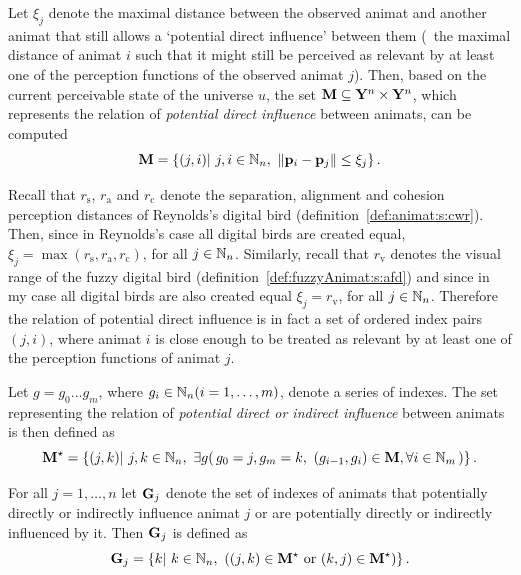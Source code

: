Let $\xi_j$ denote the maximal distance between the observed animat and another animat that still allows a `potential direct influence' between them (\ie\ the maximal distance of animat $i$ such that it might still be perceived as relevant by at least one of the perception functions of the observed animat $j$). Then, based on the current perceivable state of the universe $u$, the set ${\mathbf{M}} \subseteq {\ensuremath{\mathbf{Y}}}^n \times {\ensuremath{\mathbf{Y}}}^n$, which represents the relation of \emph{potential direct influence} between animats, can be computed
%
\begin{equation}
\set{M}=\left\{ (j,i)|\ j, i \in \N_n,\ \left\|\vect{p}_i-\vect{p}_j\right\| \leq \xi_j \right\}. \label{eq:metric:M}
\end{equation}

Recall that $r_\mathrm{s}$, $r_\mathrm{a}$ and $r_\mathrm{c}$ denote the separation, alignment and cohesion perception distances of Reynolds's digital bird (definition~\ref{def:animat:s:cwr}). Then, since in Reynolds's case all digital birds are created equal, $\xi_j=\max(r_\mathrm{s},r_\mathrm{a},r_\mathrm{c})$, for all $j \in \mathbb{N}_n$. Similarly, recall that $r_\mathrm{v}$ denotes the visual range of the fuzzy digital bird (definition~\ref{def:fuzzyAnimat:s:afd}) and since in my case all digital birds are also created equal $\xi_j=r_\mathrm{v}$, for all $j \in \mathbb{N}_n$. Therefore the relation of potential direct influence is in fact a set of ordered index pairs $(j,i)$, where animat $i$ is close enough to be treated as relevant by at least one of the perception functions of animat $j$. 

Let $g=g_0\ldots g_m$, where $g_i \in \mathbb{N}_n (i=1,\ldots,m)$, denote a series of indexes. The set representing the relation of \emph{potential direct or indirect influence} between animats is then defined as
\begin{equation}
\set{M}^\star= \left\{ (j,k)|\ j, k \in \N_n,\ \exists g \right(g_0=j, g_m=k,\ (g_{i-1}, g_i) \in \set{M}, \forall i \in \N_m\left) \right\}. \label{eq:metric:M*}
\end{equation}

For all $j=1,\ldots,n$ let ${\mathbf{G}}_j$ denote the set of indexes of animats that potentially directly or indirectly influence animat $j$ or are potentially directly or indirectly influenced by it. Then ${\mathbf{G}}_j$ is defined as
\begin{equation}
{\ensuremath{\mathbf{G}}}_j=\left\{k|\ k \in \mathbb{N}_n,\ \left((j,k) \in {\ensuremath{\mathbf{M}}}^\star\ \mathrm{or}\ (k,j) \in {\ensuremath{\mathbf{M}}}^\star\right) \right\}. \label{eq:metric:Gi}
\end{equation}

